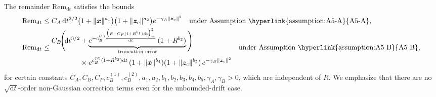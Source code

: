 \documentclass[
 longbibliography,
 twocolumn,
 superscriptaddress,
 amsmath,
 amssymb,
 amsthm,
 amsfonts,
 prl,
 floatfix,
]{revtex4-2}
\begin{document}
\begin{widetext}
The remainder $\mathrm{Rem}_{\mathrm dt}$ satisfies the bounds
\begin{subequations}\label{seq:rem_dt}
\renewcommand{\theequation}{\theparentequation-\Alph{equation}}
\begin{align}
  \mathrm{Rem}_{\mathrm dt}&
  \leq C_A\,\mathrm dt^{3/2}
  \big(1+\|\bm x\|^{a_1}\big)
  \big(1+\|\bm z_c\|^{a_2}\big)
  e^{-\gamma_A\|\bm z_c\|^2}
  \quad\text{under Assumption~\hyperlink{assumption:A5-A}{A5-A}}
  \label{seq:rem_dt_A},
  \\
  \mathrm{Rem}_{\mathrm dt}
  &\leq
  \begin{aligned}
    C_B\!\Bigg(\!
    \mathrm dt^{3/2}
    &+\underbrace{e^{-c_{B}^{(1)}\frac{\big(R-C_F(1+R^{b_1})\mathrm dt\big)_+^2}{\mathrm dt}}
    \,(1+R^{b_2})
    }_{\text{truncation error}}
    \Bigg)
    \\
    &\times
    e^{c_{B}^{(2)}(1+R^{b_3})\mathrm dt}\,
    (1+\|\bm x\|^{b_4})
    (1+\|\bm z_c\|^{b_5})\,e^{-\gamma_B\|\bm z_c\|^2}
  \end{aligned}
  \quad\text{under Assumption~\hyperlink{assumption:A5-B}{A5-B}},
  \label{seq:rem_dt_B}
\end{align}
\end{subequations}
for certain constants $C_A,C_B,C_F,c_B^{(1)},c_B^{(2)},a_1,a_2,b_1,b_2,b_3,b_4,b_5,\gamma_A,\gamma_B>0$, which are independent of $R$.
We emphasize that there are no $\sqrt{\mathrm dt}$-order non-Gaussian correction terms even for the unbounded-drift case.


\end{widetext}
\end{document}
